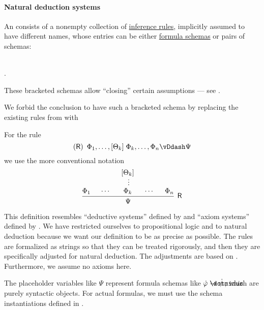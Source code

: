 \paragraph{Natural deduction systems}

\begin{definition}\label{def:abstract_propositional_natural_deduction_system}\mimprovised
  An  consists of a nonempty collection of \hyperref[def:inference_rule]{inference rules}, implicitly assumed to have different names, whose entries can be either \hyperref[def:propositional_formula_schema]{formula schemas} or pairs of schemas:
  \begin{bnf*}
     { \bnfor} \\
    .
  \end{bnf*}

  These bracketed schemas allow \enquote{closing} certain assumptions --- see .

  We forbid the conclusion to have such a bracketed schema by replacing the existing rules from  with
  \begin{bnf*}
     {}
  \end{bnf*}

  For the rule
  \begin{equation*}
    (\logic{R}) \enspace \Phi_1, \ldots, [\Theta_k] \thickspace \Phi_k, \ldots, \Phi_n \vDdash \Psi
  \end{equation*}
  we use the more conventional notation
  \begin{equation*}
    \begin{prooftree}
      \hypo{ \Phi_1 }
      \hypo{ \cdots }
      \hypo{ [\Theta_k] }
      \ellipsis {} { \Phi_k }
      \hypo{ \cdots }
      \hypo{ \Phi_n }
      \infer5[\logic{R}]{ \Psi }
    \end{prooftree}
  \end{equation*}
\end{definition}
\begin{comments}
  \item This definition resembles \enquote{deductive systems} defined by  and \enquote{axiom systems} defined by . We have restricted ourselves to propositional logic and to natural deduction because we want our definition to be as precise as possible. The rules are formalized as strings so that they can be treated rigorously, and then they are specifically adjusted for natural deduction. The adjustments are based on \cite[sec. 2.1]{TroelstraSchwichtenberg2000Proofs}. Furthermore, we assume no axioms here.

  \item The placeholder variables like \( \Psi \) represent formula schemas like \( \syn\varphi \synimplies \syn\psi \), which are purely syntactic objects. For actual formulas, we must use the schema instantiations defined in .
\end{comments}

